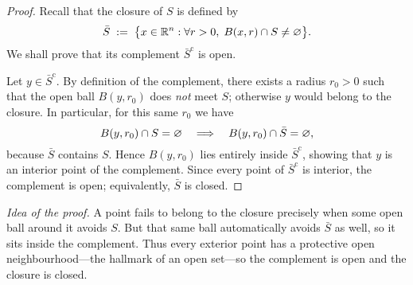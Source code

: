 \documentclass[10pt]{extarticle}
\begin{document}
\begin{proof}
    Recall that the closure of $S$ is defined by
    \[
        \bar{S}\;:=\;\bigl\{x\in\mathbb R^{n}:\forall r>0,\;B(x,r)\cap S\ne\varnothing\bigr\}.
    \]
    We shall prove that its complement $\bar{S}^{\mathrm c}$ is open.

    Let $y\in\bar{S}^{\mathrm c}$.  By definition of the complement, there exists a radius $r_{0}>0$ such that the open ball $B(y,r_{0})$ does \emph{not} meet $S$; otherwise $y$ would belong to the closure.  In particular, for this same $r_{0}$ we have
    \[
        B(y,r_{0})\cap S=\varnothing \quad\Longrightarrow\quad B(y,r_{0})\cap \bar{S}=\varnothing,
    \]
    because $\bar{S}$ contains $S$.  Hence $B(y,r_{0})$ lies entirely inside $\bar{S}^{\mathrm c}$, showing that $y$ is an interior point of the complement.  Since every point of $\bar{S}^{\mathrm c}$ is interior, the complement is open; equivalently, $\bar{S}$ is closed.
\end{proof}

\begin{remark}
    \emph{Idea of the proof.}  A point fails to belong to the closure precisely when some open ball around it avoids $S$.  But that same ball automatically avoids $\bar{S}$ as well, so it sits inside the complement.  Thus every exterior point has a protective open neighbourhood—the hallmark of an open set—so the complement is open and the closure is closed.
\end{remark}
\end{document}
